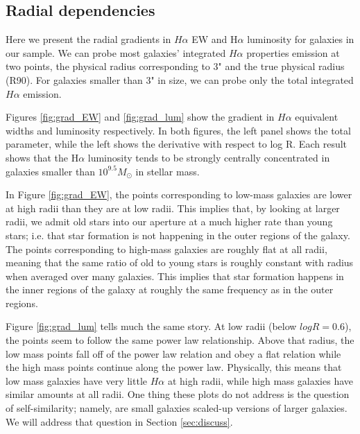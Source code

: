\documentclass[iop]{emulateapj}
\begin{document}
\subsection{Radial dependencies}

Here we present the radial gradients in $H\alpha$ EW and H$\alpha$ luminosity for galaxies in our sample. We can probe most galaxies' integrated $H\alpha$ properties  emission at two points, the physical radius corresponding to 3" and the true physical radius (R90). For galaxies smaller than 3" in size, we can probe only the total integrated $H\alpha$ emission. 

Figures \ref{fig:grad_EW} and \ref{fig:grad_lum} show the gradient in $H\alpha$ equivalent widths and luminosity respectively. In both figures, the left panel shows the total parameter, while the left shows the derivative with respect to log R. Each result shows that the H$\alpha$ luminosity tends to be strongly centrally concentrated in galaxies smaller than $10^{9.5} M_{\odot}$ in stellar mass.

In Figure \ref{fig:grad_EW}, the points corresponding to low-mass galaxies are lower at high radii than they are at low radii. This implies that, by looking at larger radii, we admit old stars into our aperture at a much higher rate than young stars; i.e. that star formation is not happening in the outer regions of the galaxy. The points corresponding to high-mass galaxies are roughly flat at all radii, meaning that the same ratio of old to young stars is roughly constant with radius when averaged over many galaxies. This implies that star formation happens in the inner regions of the galaxy at roughly the same frequency as in the outer regions. 

Figure \ref{fig:grad_lum} tells much the same story. At low radii (below $log R =0.6$), the points seem to follow the same power law relationship. Above that radius, the low mass points fall off of the power law relation and obey a flat relation while the high mass points continue along the power law. Physically, this means that low mass galaxies have very little $H\alpha$ at high radii, while high mass galaxies have similar amounts at all radii. One thing these plots do not address is the question of self-similarity; namely, are small galaxies scaled-up versions of larger galaxies. We will address that question in Section \ref{sec:discuss}.
\end{document}
